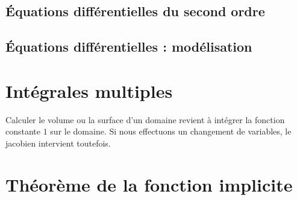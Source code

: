 					\subsection{Équations différentielles du second ordre}


					\subsection{Équations différentielles : modélisation}





					\section{Intégrales multiples}

%
%


Calculer le volume ou la surface d'un domaine revient à intégrer la fonction constante $1$ sur le domaine. Si nous effectuons un changement de variables, le jacobien intervient toutefois.



					\section{Théorème de la fonction implicite}


